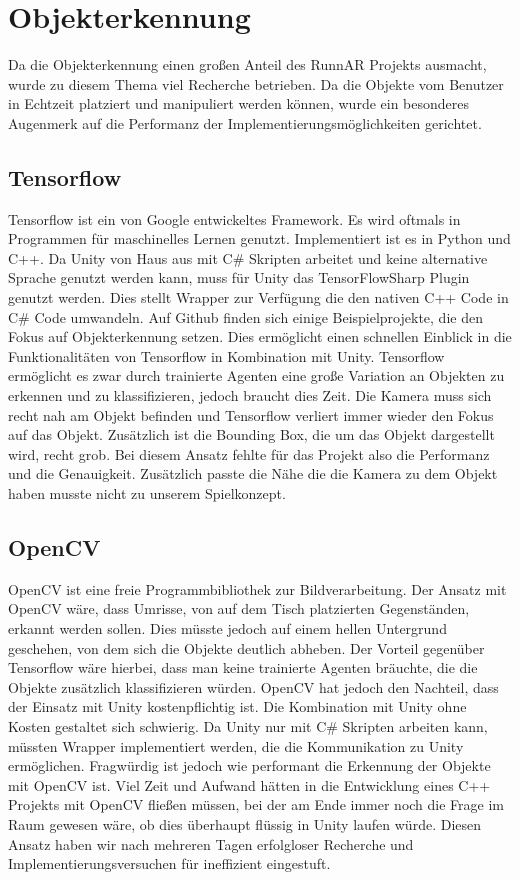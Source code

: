 \section{Objekterkennung}
Da die Objekterkennung einen großen Anteil des RunnAR Projekts ausmacht, wurde zu diesem Thema viel Recherche betrieben. Da die Objekte vom Benutzer in Echtzeit platziert und manipuliert werden können, wurde ein besonderes Augenmerk auf die Performanz der Implementierungsmöglichkeiten gerichtet.
\subsection{Tensorflow}
Tensorflow ist ein von Google entwickeltes Framework. Es wird oftmals in Programmen für maschinelles Lernen genutzt.  Implementiert ist es in Python und C++. Da Unity von Haus aus mit C\# Skripten arbeitet und keine alternative Sprache genutzt werden kann, muss für Unity das TensorFlowSharp Plugin genutzt werden. Dies stellt Wrapper zur Verfügung die den nativen C++ Code in C\#  Code umwandeln. Auf Github finden sich einige Beispielprojekte, die den Fokus auf Objekterkennung setzen. Dies ermöglicht einen schnellen Einblick in die Funktionalitäten von Tensorflow in Kombination mit Unity. Tensorflow ermöglicht es zwar durch trainierte Agenten eine große Variation an Objekten zu erkennen und zu klassifizieren, jedoch braucht dies Zeit. Die Kamera muss sich recht nah am Objekt befinden und Tensorflow verliert immer wieder den Fokus auf das Objekt. Zusätzlich ist die Bounding Box, die um das Objekt dargestellt wird, recht grob. Bei diesem Ansatz fehlte für das Projekt also die Performanz und die Genauigkeit. Zusätzlich passte die Nähe die die Kamera zu dem Objekt haben musste nicht zu unserem Spielkonzept.\cite{TensorFlow}

\subsection{OpenCV}
OpenCV ist eine freie Programmbibliothek zur Bildverarbeitung. Der Ansatz mit OpenCV wäre, dass Umrisse, von auf dem Tisch platzierten Gegenständen, erkannt werden sollen. Dies müsste jedoch auf einem hellen Untergrund geschehen, von dem sich die Objekte deutlich abheben. Der Vorteil gegenüber Tensorflow wäre hierbei, dass man keine trainierte Agenten bräuchte, die die Objekte zusätzlich klassifizieren würden. OpenCV hat jedoch den Nachteil, dass der Einsatz mit Unity kostenpflichtig ist. Die Kombination mit Unity ohne Kosten gestaltet sich schwierig. Da Unity nur mit C\#  Skripten arbeiten kann, müssten Wrapper implementiert werden, die die Kommunikation zu Unity ermöglichen. Fragwürdig ist jedoch wie performant die Erkennung der Objekte mit OpenCV ist. Viel Zeit und Aufwand hätten in die Entwicklung eines C++ Projekts mit OpenCV fließen müssen, bei der am Ende immer noch die Frage im Raum gewesen wäre, ob dies überhaupt flüssig in Unity laufen würde. Diesen Ansatz haben wir nach mehreren Tagen erfolgloser  Recherche und Implementierungsversuchen für ineffizient eingestuft. 


